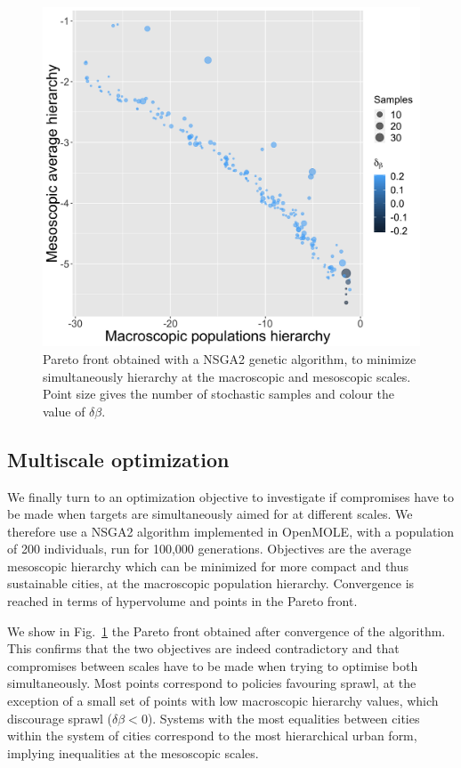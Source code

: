 \documentclass[ijgi,article,submit,moreauthors,pdftex]{Definitions/mdpi}
\begin{document}
\begin{figure}[H]
	\begin{center}
	\includegraphics[width=0.6\linewidth]{figures/pareto_macroHierarchy-mesoHierarchy.png}
	\end{center}
	\caption{Pareto front obtained with a NSGA2 genetic algorithm, to minimize simultaneously hierarchy at the macroscopic and mesoscopic scales. Point size gives the number of stochastic samples and colour the value of $\delta \beta$.\label{fig:fig7}}
\end{figure}

\subsection{Multiscale optimization}



We finally turn to an optimization objective to investigate if compromises have to be made when targets are simultaneously aimed for at different scales. We therefore use a NSGA2 algorithm implemented in OpenMOLE, with a population of 200 individuals, run for 100,000 generations. Objectives are the average mesoscopic hierarchy which can be minimized for more compact and thus sustainable cities, at the macroscopic population hierarchy. Convergence is reached in terms of hypervolume and points in the Pareto front.

We show in Fig.~\ref{fig:fig7} the Pareto front obtained after convergence of the algorithm. This confirms that the two objectives are indeed contradictory and that compromises between scales have to be made when trying to optimise both simultaneously. Most points correspond to policies favouring sprawl, at the exception of a small set of points with low macroscopic hierarchy values, which discourage sprawl ($\delta \beta < 0$). Systems with the most equalities between cities within the system of cities correspond to the most hierarchical urban form, implying inequalities at the mesoscopic scales.
\end{document}
